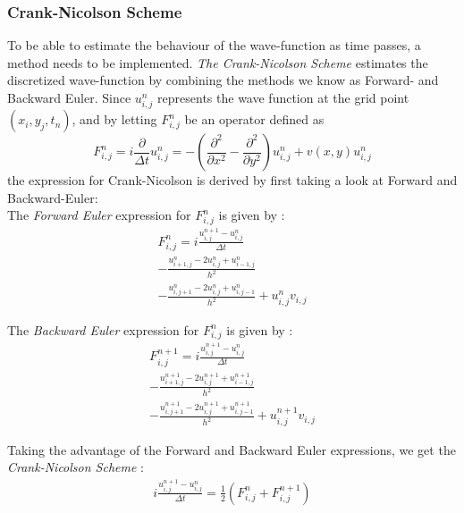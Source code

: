 \documentclass[10pt, nofootinbib, twocolumn]{revtex4-1}
\begin{document}
\subsubsection{Crank-Nicolson Scheme}\label{sec:crank}
To be able to estimate the behaviour of the wave-function as time passes, a method needs to be implemented. 
\textit{The Crank-Nicolson Scheme} estimates the discretized wave-function by combining the methods we know as Forward- and Backward Euler. Since \( u_{i,j}^n \) represents the wave function at the grid point \( (x_i, y_j, t_n) \), and by letting \( F_{i,j}^n \) be an operator defined as
\begin{equation}\label{eq:probdis}
    F_{i,j}^n = i \frac{\partial}{\Delta t} u^n_{i,j}= -(\frac{\partial^2 }{\partial x^2} - \frac{\partial^2 }{\partial y^2})u^n_{i,j} + v(x,y) u^n_{i,j}
\end{equation}
the expression for Crank-Nicolson is derived by first taking a look at Forward and Backward-Euler:\\
The \textit{Forward Euler} expression for \( F_{i,j}^n \) is given by \cite{notes}: \\
\begin{equation}\label{eq:forward}
    \begin{split}
        F_{i,j}^n = i \frac{u^{n+1}_{i,j}-u^{n}_{i,j}}{\Delta t} \\
        -\frac{u^n_{i+1,j}-2u^n_{i,j}+u^n_{i-1,j}}{h^2} \\
        - \frac{u^n_{i,j+1}-2u^n_{i,j}+u^n_{i,j-1} }{h^2} + u^n_{i,j}v_{i,j}
    \end{split}
\end{equation}

The \textit{Backward Euler} expression for \( F_{i,j}^n \) is given by \cite{notes}: \\
\begin{equation}\label{eq:backward}
    \begin{split}
        F_{i,j}^{n+1} = i \frac{u^{n+1}_{i,j}-u^{n}_{i,j}}{\Delta t} \\
        -\frac{u^{n+1}_{i+1,j}- 2u^{n+1}_{i,j}+u^{n+1}_{i-1,j}}{h^2} \\ -  \frac{u^{n+1}_{i,j+1}-2u^{n+1}_{i,j}+u^{n+1}_{i,j-1} }{h^2} + u^{n+1}_{i,j}v_{i,j}
    \end{split}
\end{equation}

Taking the advantage of the Forward and Backward Euler expressions, we get the \textit{Crank-Nicolson Scheme} \cite{notes}: 
\begin{equation}\label{eq:crank}
    \begin{split}
        i \frac{u^{n+1}_{i,j}-u^{n}_{i,j}}{\Delta t} = \frac{1}{2}(F_{i,j}^n+F_{i,j}^{n+1})  
    \end{split}
\end{equation}
\end{document}
